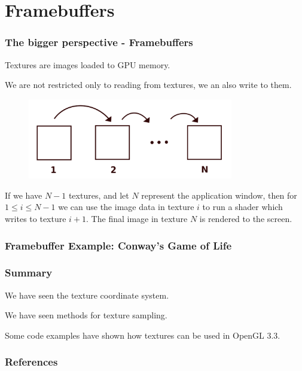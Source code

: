 \documentclass{beamer}
\begin{document}
\section{Framebuffers}
%
%
%
\begin{frame}
\frametitle{The bigger perspective - Framebuffers}
Textures are images loaded to GPU memory.

We are not restricted only to reading from textures,
we an also write to them.

\begin{figure}
\includegraphics[width=0.8\textwidth]{images/framebuffers.png}
\end{figure}
If we have $N-1$ textures, and let $N$ represent the application window,
then for $1 \leq i \leq N - 1$ we can use the image data in texture $i$
to run a shader which writes to texture $i+1$. The final image in
texture $N$ is rendered to the screen.
\end{frame}


%
%
%
\begin{frame}
\frametitle{Framebuffer Example: Conway's Game of Life}
\end{frame}


%
%
%
\begin{frame}
\frametitle{Summary}
We have seen the texture coordinate system.

\vspace{5mm}
We have seen methods for texture sampling.

\vspace{5mm}
Some code examples have shown how textures can be used in OpenGL 3.3.
\end{frame}


%
%
%
\begin{frame}
\frametitle{References}
\nocite{*}
{}

\end{frame}
\end{document}

